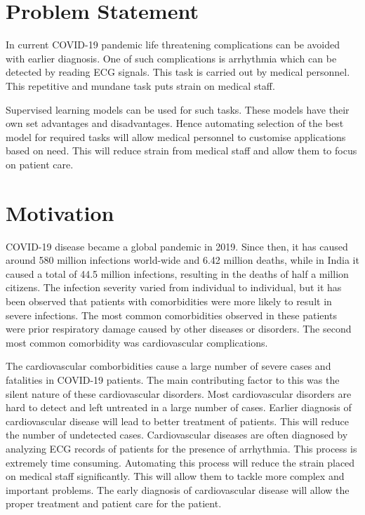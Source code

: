 \section{Problem Statement} \label{sec:problem_statement}
In current COVID-19 pandemic life threatening complications can be avoided with earlier diagnosis. One of such complications is arrhythmia which can be detected by reading ECG signals. This task is carried out by medical personnel. This repetitive and mundane task puts strain on medical staff.

Supervised learning models can be used for such tasks. These models have their own set advantages and disadvantages. Hence automating selection of the best model for required tasks will allow medical personnel to customise applications based on need. This will reduce strain from medical staff and allow them to focus on patient care.

\section{Motivation} \label{sec:motivation}

COVID-19 disease became a global pandemic in 2019. Since then, it has caused around 580 million infections world-wide and 6.42 million deaths, while in India it caused a total of 44.5 million infections, resulting in the deaths of half a million citizens. The infection severity varied from individual to individual, but it has been observed that patients with comorbidities were more likely to result in severe infections. The most common comorbidities observed in these patients were prior respiratory damage caused by other diseases or disorders. The second most common comorbidity was cardiovascular complications.

The cardiovascular comborbidities cause a large number of severe cases and fatalities in COVID-19 patients. The main contributing factor to this was the silent nature of these cardiovascular disorders. Most cardiovascular disorders are hard to detect and left untreated in a large number of cases. Earlier diagnosis of cardiovascular disease will lead to better treatment of patients. This will reduce the number of undetected cases. Cardiovascular diseases are often diagnosed by analyzing ECG records of patients for the presence of arrhythmia. This process is extremely time consuming. Automating this process will reduce the strain placed on medical staff significantly. This will allow them to tackle more complex and important problems. The early diagnosis of cardiovascular disease will allow the proper treatment and patient care for the patient.


